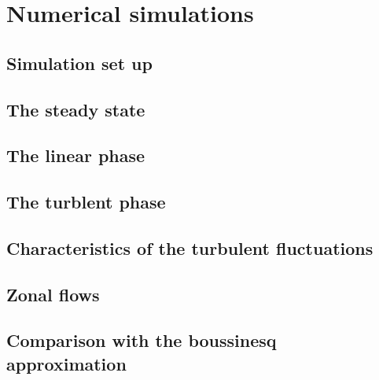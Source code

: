\documentclass[12pt,a4paper,oneside,openright]{report} %
\begin{document}
% 
% 
% 
% 
% 
% 
% 
% 
%
\part{Numerical simulations}
\label{part:results}

\chapter{Simulation set up}

\chapter{The steady state}

\chapter{The linear phase}

\chapter{The turblent phase}
\label{chap:satTurb}

\chapter{Characteristics of the turbulent fluctuations}



\chapter{Zonal flows}

\chapter{Comparison with the boussinesq approximation}

\end{document}
